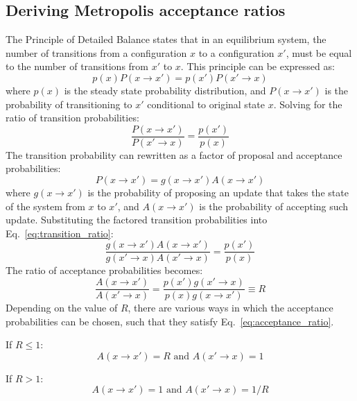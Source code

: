 \documentclass[12pt, two sided]{article}
\begin{document}
\subsection{Deriving Metropolis acceptance ratios}

The Principle of Detailed Balance states that in an equilibrium system, the number of transitions from a configuration $x$ to a configuration $x'$, must be equal to the number of transitions from $x'$ to $x$. This principle can be expressed as:
%
\begin{equation}
\label{eq:detailed_balance_principle}
p(x)P(x \to x') = p(x') P(x' \to x)
\end{equation}
%
where $p(x)$ is the steady state probability distribution, and $P(x \to x')$ is the probability of transitioning to $x'$ conditional to original state $x$. Solving for the ratio of transition probabilities:
%
\begin{equation}
\label{eq:transition_ratio}
\frac{P(x \to x')}{P(x' \to x)} = \frac{p(x')}{p(x)} 
\end{equation}
%
The transition probability can rewritten as a factor of proposal and acceptance probabilities:
%
\begin{equation}
P(x \to x') = g(x \to x') A(x \to x')
\end{equation}
%
where $g(x \to x')$ is the probability of proposing an update that takes the state of the system from $x$ to $x'$, and $A(x \to x')$ is the probability of accepting such update. Substituting the factored transition probabilities into Eq.~\eqref{eq:transition_ratio}:
%
\begin{equation}
\frac{g(x \to x') A(x \to x')}{ g(x' \to x) A(x' \to x)} = \frac{p(x')}{p(x)} 
\end{equation}
%
The ratio of acceptance probabilities becomes:
%
\begin{equation}
\label{eq:acceptance_ratio}
\frac{A(x \to x')}{A(x' \to x)} = \frac{p(x')g(x' \to x)}{p(x) g(x \to x')} \equiv R
\end{equation}
%
Depending on the value of $R$, there are various ways in which the acceptance probabilities can be chosen, such that they satisfy Eq.~\eqref{eq:acceptance_ratio}.

If $R \leq 1$:
%
\begin{equation} 
A(x \to x' ) = R \text{ and } A(x' \to x) = 1 \nonumber
\end{equation}
%

If $R > 1$: 
\begin{equation}
A(x \to x' ) = 1 \text{ and } A(x' \to x) = 1/R \nonumber
\end{equation}
\end{document}
